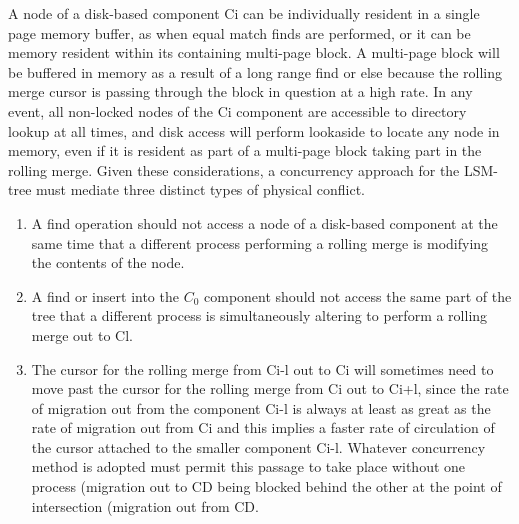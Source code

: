 \documentclass[a4paper,12pt,notitlepage,twoside,openright]{article}
\begin{document}
A node of a disk-based component Ci can be individually resident in a
single page memory buffer, as when equal match finds are performed, or
it can be memory resident within its containing multi-page block. A
multi-page block will be buffered in memory as a result of a long range
find or else because the rolling merge cursor is passing through the
block in question at a high rate. In any event, all non-locked nodes of
the Ci component are accessible to directory lookup at all times, and
disk access will perform lookaside to locate any node in memory, even if
it is resident as part of a multi-page block taking part in the rolling
merge. Given these considerations, a concurrency approach for the
LSM-tree must mediate three distinct types of physical conflict.


\begin{enumerate}
\def\labelenumi{\roman{enumi}.}
\item
  A find operation should not access a node of a disk-based component at
  the same time that a different process performing a rolling merge is
  modifying the contents of the node.
\item
  A find or insert into the \(C_0\) component should not access the same part
  of the tree that a different process is simultaneously altering to
  perform a rolling merge out to Cl.
\item
  The cursor for the rolling merge from Ci-l out to Ci will sometimes
  need to move past the cursor for the rolling merge from Ci out to
  Ci+l, since the rate of migration out from the component Ci-l is
  always at least as great as the rate of migration out from Ci and this
  implies a faster rate of circulation of the cursor attached to the
  smaller component Ci-l. Whatever concurrency method is adopted must
  permit this passage to take place without one process (migration out
  to CD being blocked behind the other at the point of intersection
  (migration out from CD.
\end{enumerate}
\end{document}
